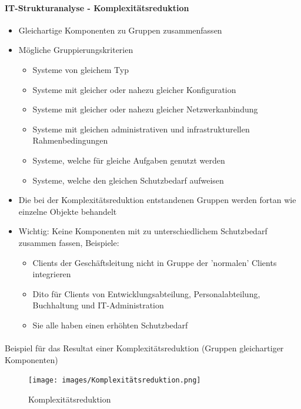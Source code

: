 \documentclass[10pt,a4paper]{article}
\begin{document}
\paragraph*{IT-Strukturanalyse - Komplexitätsreduktion}
\begin{itemize}[noitemsep,topsep=0pt,leftmargin=*]
    \item Gleichartige Komponenten zu Gruppen
    zusammenfassen
    \item Mögliche Gruppierungskriterien
    \begin{itemize}[noitemsep,topsep=0pt,leftmargin=*]
        \item Systeme von gleichem Typ
        \item Systeme mit gleicher oder nahezu gleicher Konfiguration
        \item Systeme mit gleicher oder nahezu gleicher
        Netzwerkanbindung
        \item Systeme mit gleichen administrativen und
        infrastrukturellen Rahmenbedingungen
        \item Systeme, welche für gleiche Aufgaben genutzt werden
        \item Systeme, welche den gleichen Schutzbedarf aufweisen
    \end{itemize}
    \item Die bei der Komplexitätsreduktion entstandenen
    Gruppen werden fortan wie einzelne Objekte
    behandelt
    \item Wichtig: Keine Komponenten mit zu
    unterschiedlichem Schutzbedarf zusammen fassen,
    Beispiele:
    \begin{itemize}[noitemsep,topsep=0pt,leftmargin=*]
        \item Clients der Geschäftsleitung nicht in Gruppe der
        'normalen' Clients integrieren
        \item Dito für Clients von Entwicklungsabteilung,
        Personalabteilung, Buchhaltung und IT-Administration
        \item Sie alle haben einen erhöhten Schutzbedarf
    \end{itemize}
\end{itemize}

\paragraph*{}Beispiel für das Resultat einer Komplexitätsreduktion (Gruppen gleichartiger Komponenten)
\begin{figure}[H]
    \begin{center}
    \texttt{[image: images/Komplexitätsreduktion.png]}
    \caption{Komplexitätsreduktion}
    \label{Komplexitätsreduktion}
    \end{center}
\end{figure}
\end{document}
